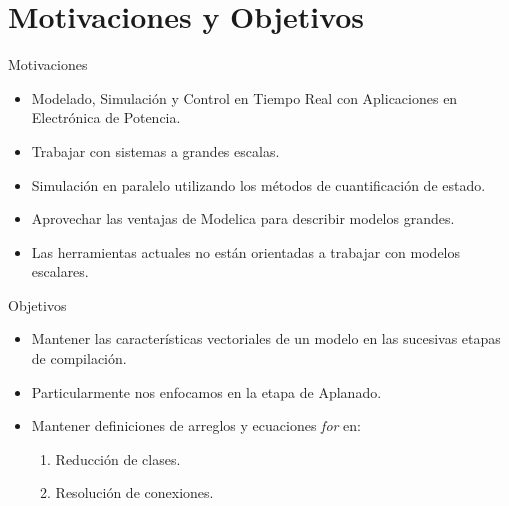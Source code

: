 \section{Motivaciones y Objetivos}  

\begin{frame}{Motivaciones}
    \begin{itemize}
    \setlength\itemsep{1em}
     \item Modelado, Simulación y Control en Tiempo Real con Aplicaciones en Electrónica de Potencia.
     \item Trabajar con sistemas a grandes escalas.
     \item Simulación en paralelo utilizando los métodos de cuantificación de estado.       
     \item Aprovechar las ventajas de Modelica para describir modelos grandes.
     \item Las herramientas actuales no están orientadas a trabajar con modelos escalares.
    \end{itemize}
\end{frame}

\begin{frame}{Objetivos}
    \begin{itemize}
    \setlength\itemsep{1em}
     \item Mantener las características vectoriales de un modelo en las sucesivas etapas de compilación.
     \item Particularmente nos enfocamos en la etapa de Aplanado.
     \item Mantener definiciones de arreglos y ecuaciones \textit{for} en:
        \begin{enumerate}
            \setlength\itemsep{1em}
            \item Reducción de clases.
            \item Resolución de conexiones.
        \end{enumerate}
    \end{itemize}
\end{frame}
